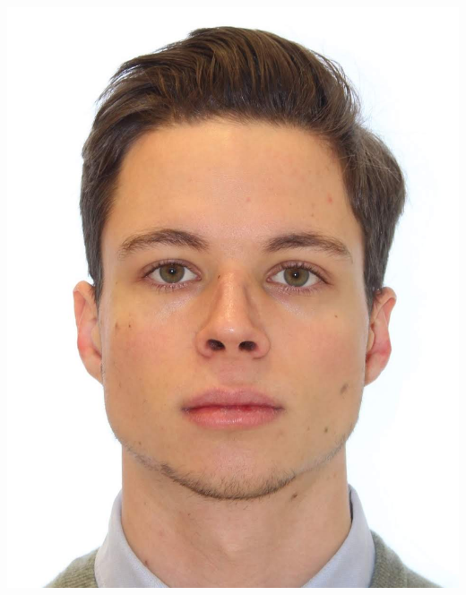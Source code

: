 \documentclass{ResumeTemplate}
\begin{document}
    \raggedright\begin{minipage}[c]{0.28\linewidth} 
        \centering\includegraphics[width=0.65\linewidth]{me}


    \end{minipage}
    \vspace{0.5cm}
\end{document}
